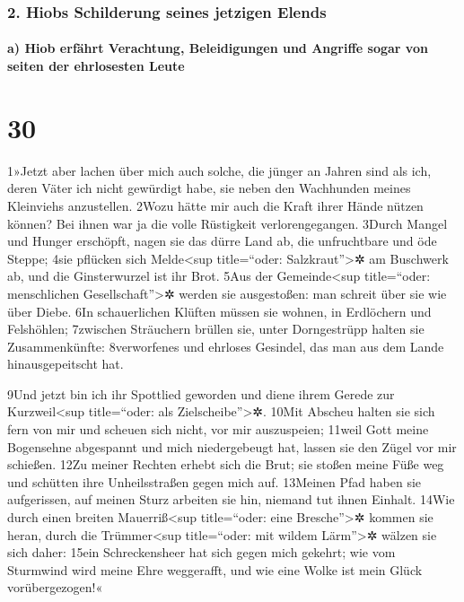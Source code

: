 \hypertarget{hiobs-schilderung-seines-jetzigen-elends}{%
\subsubsection{2. Hiobs Schilderung seines jetzigen
Elends}\label{hiobs-schilderung-seines-jetzigen-elends}}

\hypertarget{a-hiob-erfuxe4hrt-verachtung-beleidigungen-und-angriffe-sogar-von-seiten-der-ehrlosesten-leute}{%
\paragraph{a) Hiob erfährt Verachtung, Beleidigungen und Angriffe sogar
von seiten der ehrlosesten
Leute}\label{a-hiob-erfuxe4hrt-verachtung-beleidigungen-und-angriffe-sogar-von-seiten-der-ehrlosesten-leute}}

\hypertarget{section-29}{%
\section{30}\label{section-29}}

1»Jetzt aber lachen über mich auch solche, die jünger an Jahren sind als
ich, deren Väter ich nicht gewürdigt habe, sie neben den Wachhunden
meines Kleinviehs anzustellen. 2Wozu hätte mir auch die Kraft ihrer
Hände nützen können? Bei ihnen war ja die volle Rüstigkeit
verlorengegangen. 3Durch Mangel und Hunger erschöpft, nagen sie das
dürre Land ab, die unfruchtbare und öde Steppe; 4sie pflücken sich
Melde\textless sup title=``oder: Salzkraut''\textgreater✲ am Buschwerk
ab, und die Ginsterwurzel ist ihr Brot. 5Aus der Gemeinde\textless sup
title=``oder: menschlichen Gesellschaft''\textgreater✲ werden sie
ausgestoßen: man schreit über sie wie über Diebe. 6In schauerlichen
Klüften müssen sie wohnen, in Erdlöchern und Felshöhlen; 7zwischen
Sträuchern brüllen sie, unter Dorngestrüpp halten sie Zusammenkünfte:
8verworfenes und ehrloses Gesindel, das man aus dem Lande
hinausgepeitscht hat.

9Und jetzt bin ich ihr Spottlied geworden und diene ihrem Gerede zur
Kurzweil\textless sup title=``oder: als Zielscheibe''\textgreater✲.
10Mit Abscheu halten sie sich fern von mir und scheuen sich nicht, vor
mir auszuspeien; 11weil Gott meine Bogensehne abgespannt und mich
niedergebeugt hat, lassen sie den Zügel vor mir schießen. 12Zu meiner
Rechten erhebt sich die Brut; sie stoßen meine Füße weg und schütten
ihre Unheilsstraßen gegen mich auf. 13Meinen Pfad haben sie aufgerissen,
auf meinen Sturz arbeiten sie hin, niemand tut ihnen Einhalt. 14Wie
durch einen breiten Mauerriß\textless sup title=``oder: eine
Bresche''\textgreater✲ kommen sie heran, durch die Trümmer\textless sup
title=``oder: mit wildem Lärm''\textgreater✲ wälzen sie sich daher:
15ein Schreckensheer hat sich gegen mich gekehrt; wie vom Sturmwind wird
meine Ehre weggerafft, und wie eine Wolke ist mein Glück
vorübergezogen!«

